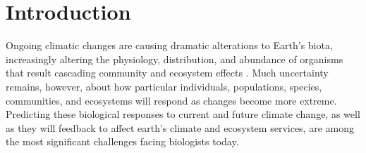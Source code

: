 \documentclass{article}
\begin{document}
\section* {Introduction}
\par Ongoing climatic changes are causing dramatic alterations to Earth's biota, increasingly altering the physiology, distribution, and abundance of organisms that result cascading community and ecosystem effects \citep{thomas2004,parmesan2006,sheldon2011,urban2012}.  Much uncertainty remains, however, about how particular individuals, populations, species, communities, and ecosystems will respond as changes become more extreme. Predicting these biological responses to current and future climate change, as well as they will feedback to affect earth's climate and ecosystem services, are among the most significant challenges facing biologists today.
\end{document}
